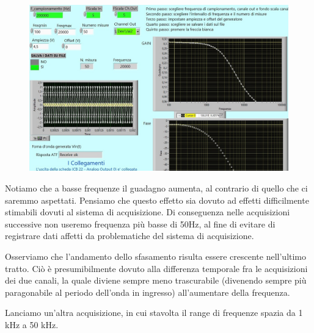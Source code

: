 \begin{figure}[H]
\caption{}
    \includegraphics[width=12cm]{settimana_2/immagini/CRRC_2.jpg}
    \centering
\end{figure}

Notiamo che a basse frequenze il guadagno aumenta, al contrario di quello che ci saremmo aspettati. Pensiamo che questo effetto sia dovuto ad effetti difficilmente stimabili dovuti al sistema di acquisizione. Di conseguenza nelle acquisizioni successive non useremo frequenza più basse di 50Hz, al fine di evitare di registrare dati affetti da problematiche del sistema di acquisizione.

Osserviamo che l'andamento dello sfasamento risulta essere crescente nell'ultimo tratto. Ciò è presumibilmente dovuto alla differenza temporale fra le acquisizioni dei due canali, la quale diviene sempre meno trascurabile (divenendo sempre più paragonabile al periodo dell'onda in ingresso) all'aumentare della frequenza.




Lanciamo un'altra acquisizione, in cui stavolta il range di frequenze spazia da 1 kHz a 50 kHz.

